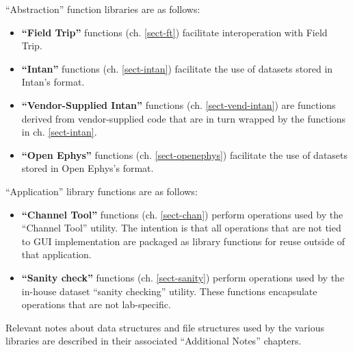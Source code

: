``Abstraction'' function libraries are as follows:

\begin{itemize}
%
\item \textbf{``Field Trip''} functions (ch. \ref{sect-ft}) facilitate
interoperation with Field Trip.
%
\item \textbf{``Intan''} functions (ch. \ref{sect-intan}) facilitate the use
of datasets stored in Intan's format.
%
\item \textbf{``Vendor-Supplied Intan''} functions
(ch. \ref{sect-vend-intan}) are functions derived from vendor-supplied code
that are in turn wrapped by the functions in ch. \ref{sect-intan}.
%
\item \textbf{``Open Ephys''} functions (ch. \ref{sect-openephys})
facilitate the use of datasets stored in Open Ephys's format.
%
\end{itemize}

\clearpage
``Application'' library functions are as follows:

\begin{itemize}
%
\item \textbf{``Channel Tool''} functions (ch. \ref{sect-chan}) perform
operations used by the ``Channel Tool'' utility. The intention is that all
operations that are not tied to GUI implementation are packaged as library
functions for reuse outside of that application.
%
\item \textbf{``Sanity check''} functions (ch. \ref{sect-sanity}) perform
operations used by the in-house dataset ``sanity checking'' utility. These
functions encapsulate operations that are not lab-specific.
%
\end{itemize}

Relevant notes about data structures and file structures used by the
various libraries are described in their associated ``Additional Notes''
chapters.

%
